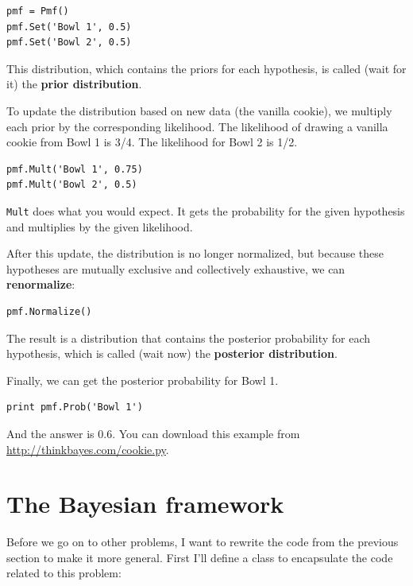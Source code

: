 \documentclass[12pt]{book}
\begin{document}
\begin{verbatim}
pmf = Pmf()
pmf.Set('Bowl 1', 0.5)
pmf.Set('Bowl 2', 0.5)
\end{verbatim}

This distribution, which contains the priors for each hypothesis,
is called (wait for it) the {\bf prior distribution}.

To update the distribution based on new data (the vanilla cookie),
we multiply each prior by the corresponding likelihood.  The likelihood
of drawing a vanilla cookie from Bowl 1 is 3/4.  The likelihood
for Bowl 2 is 1/2.

\begin{verbatim}
pmf.Mult('Bowl 1', 0.75)
pmf.Mult('Bowl 2', 0.5)
\end{verbatim}

\verb"Mult" does what you would expect.  It gets the probability
for the given hypothesis and multiplies by the given likelihood.

After this update, the distribution is no longer normalized, but
because these hypotheses are mutually exclusive and collectively
exhaustive, we can {\bf renormalize}:

\begin{verbatim}
pmf.Normalize()
\end{verbatim}

The result is a distribution that contains the posterior probability
for each hypothesis, which is called (wait now) the
{\bf posterior distribution}.

Finally, we can get the posterior probability for Bowl 1.

\begin{verbatim}
print pmf.Prob('Bowl 1')
\end{verbatim}

And the answer is 0.6.  You can download this example
from \url{http://thinkbayes.com/cookie.py}.


\section{The Bayesian framework}
\label{framework}

Before we go on to other problems, I want to rewrite the code
from the previous section to make it more general.  First I'll
define a class to encapsulate the code related to this problem:
\end{document}
